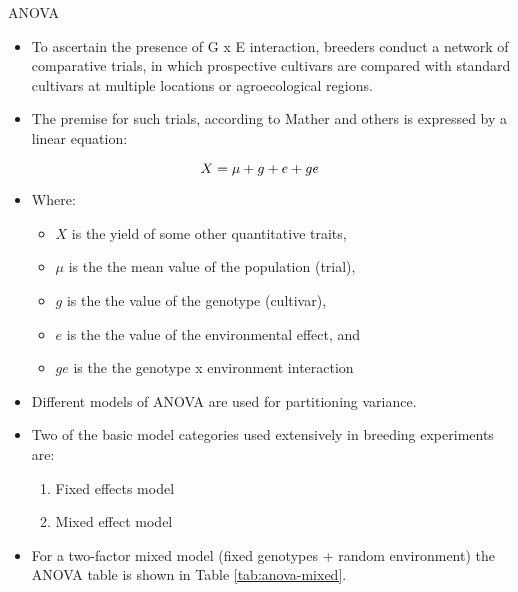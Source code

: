 \documentclass[11pt,dvipsnames,ignorenonframetext,aspectratio=169]{beamer}
\providecommand{\tightlist}{%
  \setlength{\itemsep}{0pt}\setlength{\parskip}{0pt}}
\begin{document}
\begin{frame}{ANOVA}
\protect\hypertarget{anova}{}

\begin{itemize}
\tightlist
\item
  To ascertain the presence of G x E interaction, breeders conduct a
  network of comparative trials, in which prospective cultivars are
  compared with standard cultivars at multiple locations or
  agroecological regions.
\item
  The premise for such trials, according to Mather and others is
  expressed by a linear equation:
\end{itemize}

\[
\Large
X = \mu + g + e + ge
\]

\end{frame}

\begin{frame}{}
\protect\hypertarget{section-5}{}

\begin{itemize}
\tightlist
\item
  Where:

  \begin{itemize}
  \tightlist
  \item
    \(X\) is the yield of some other quantitative traits,
  \item
    \(\mu\) is the the mean value of the population (trial),
  \item
    \(g\) is the the value of the genotype (cultivar),
  \item
    \(e\) is the the value of the environmental effect, and
  \item
    \(ge\) is the the genotype x environment interaction
  \end{itemize}
\end{itemize}

\end{frame}

\begin{frame}{}
\protect\hypertarget{section-6}{}

\begin{itemize}
\tightlist
\item
  Different models of ANOVA are used for partitioning variance.
\item
  Two of the basic model categories used extensively in breeding
  experiments are:

  \begin{enumerate}
  \tightlist
  \item
    Fixed effects model
  \item
    Mixed effect model
  \end{enumerate}
\item
  For a two-factor mixed model (fixed genotypes + random environment)
  the ANOVA table is shown in Table \ref{tab:anova-mixed}.
\end{itemize}

\end{frame}
\end{document}
